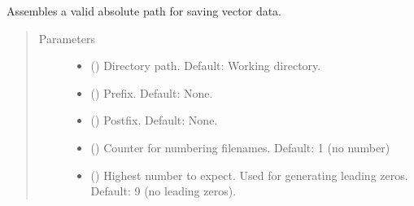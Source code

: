 \documentclass[letterpaper,10pt,english]{sphinxmanual}
\begin{document}
\begin{fulllineitems}
\label{\detokenize{open_piv_gui_tools:openpivgui.open_piv_gui_tools.create_save_vec_fname}}
Assembles a valid absolute path for saving vector data.
\begin{quote}\begin{description}
\item[{Parameters}] \leavevmode\begin{itemize}
\item {} 
 () \textendash{} Directory path. Default: Working directory.

\item {} 
 () \textendash{} Prefix. Default: None.

\item {} 
 () \textendash{} Postfix. Default: None.

\item {} 
 () \textendash{} Counter for numbering filenames.
Default: \sphinxhyphen{}1 (no number)

\item {} 
 () \textendash{} Highest number to expect. Used for generating
leading zeros. Default: 9 (no leading zeros).

\end{itemize}

\end{description}\end{quote}

\end{fulllineitems}
\end{document}
